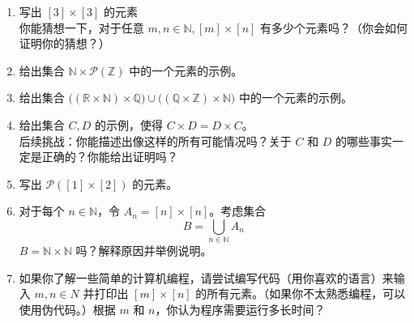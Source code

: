 \begin{enumerate}[label=(\arabic*)]
    \item 写出 $[3] \times [3]$ 的元素  \\
    你能猜想一下，对于任意 $m, n \in \mathbb{N}, [m] \times [n]$ 有多少个元素吗？（你会如何证明你的猜想？）
    \item 给出集合 $\mathbb{N} \times \mathcal{P}(\mathbb{Z})$ 中的一个元素的示例。
    \item 给出集合 $\big((\mathbb{R} \times \mathbb{N}) \times \mathbb{Q}\big) \cup \big((\mathbb{Q} \times \mathbb{Z}) \times \mathbb{N}\big)$ 中的一个元素的示例。
    \item 给出集合 $C, D$ 的示例，使得 $C \times D = D \times C$。\\
    后续挑战：你能描述出像这样的所有可能情况吗？关于 $C$ 和 $D$ 的哪些事实一定是正确的？你能给出证明吗？
    \item 写出 $\mathcal{P}([1] \times [2])$ 的元素。
    \item 对于每个 $n \in \mathbb{N}$，令 $A_n = [n] \times [n]$。考虑集合
    \[B = \bigcup_{n \in \mathbb{N}} A_n\]
    $B = \mathbb{N} \times \mathbb{N}$ 吗？解释原因并举例说明。
    \item 如果你了解一些简单的计算机编程，请尝试编写代码（用你喜欢的语言）来输入 $m, n \in N$ 并打印出 $[m] \times [n]$ 的所有元素。（如果你不太熟悉编程，可以使用伪代码。）根据 $m$ 和 $n$，你认为程序需要运行多长时间？
\end{enumerate}